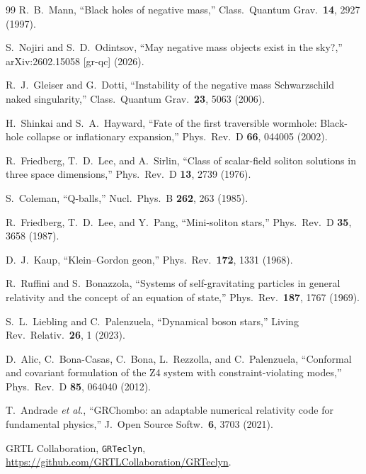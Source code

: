 \documentclass[twocolumn,floatfix,aps,prd,superscriptaddress,nofootinbib]{revtex4-2}
\begin{document}
\begin{thebibliography}{99}
R.~B.~Mann,
\newblock ``Black holes of negative mass,''
\newblock Class.\ Quantum Grav.\ \textbf{14}, 2927 (1997).

S.~Nojiri and S.~D.~Odintsov,
\newblock ``May negative mass objects exist in the sky?,''
\newblock arXiv:2602.15058 [gr-qc] (2026).

R.~J.~Gleiser and G.~Dotti,
\newblock ``Instability of the negative mass Schwarzschild naked singularity,''
\newblock Class.\ Quantum Grav.\ \textbf{23}, 5063 (2006).

H.~Shinkai and S.~A.~Hayward,
\newblock ``Fate of the first traversible wormhole: Black-hole collapse or inflationary expansion,''
\newblock Phys.\ Rev.\ D \textbf{66}, 044005 (2002).

R.~Friedberg, T.~D.~Lee, and A.~Sirlin,
\newblock ``Class of scalar-field soliton solutions in three space dimensions,''
\newblock Phys.\ Rev.\ D \textbf{13}, 2739 (1976).

S.~Coleman,
\newblock ``Q-balls,''
\newblock Nucl.\ Phys.\ B \textbf{262}, 263 (1985).

R.~Friedberg, T.~D.~Lee, and Y.~Pang,
\newblock ``Mini-soliton stars,''
\newblock Phys.\ Rev.\ D \textbf{35}, 3658 (1987).

D.~J.~Kaup,
\newblock ``Klein--Gordon geon,''
\newblock Phys.\ Rev.\ \textbf{172}, 1331 (1968).

R.~Ruffini and S.~Bonazzola,
\newblock ``Systems of self-gravitating particles in general relativity and the concept of an equation of state,''
\newblock Phys.\ Rev.\ \textbf{187}, 1767 (1969).

S.~L.~Liebling and C.~Palenzuela,
\newblock ``Dynamical boson stars,''
\newblock Living Rev.\ Relativ.\ \textbf{26}, 1 (2023).

D.~Alic, C.~Bona-Casas, C.~Bona, L.~Rezzolla, and C.~Palenzuela,
\newblock ``Conformal and covariant formulation of the Z4 system with constraint-violating modes,''
\newblock Phys.\ Rev.\ D \textbf{85}, 064040 (2012).

T.~Andrade \emph{et al.},
\newblock ``GRChombo: an adaptable numerical relativity code for fundamental physics,''
\newblock J.\ Open Source Softw.\ \textbf{6}, 3703 (2021).

GRTL Collaboration,
\newblock \texttt{GRTeclyn},
\newblock \url{https://github.com/GRTLCollaboration/GRTeclyn}.


\end{thebibliography}
\end{document}
